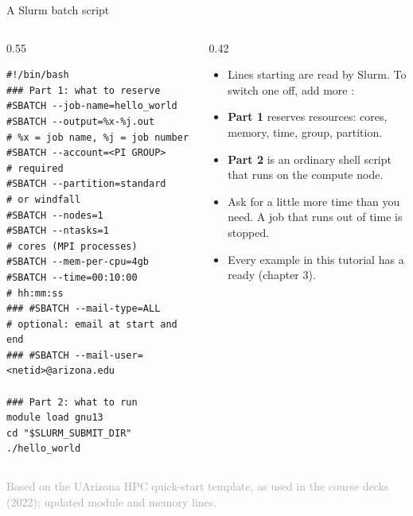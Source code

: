 \documentclass[aspectratio=169,11pt]{beamer}
\newcommand{\sourcecredit}[1]{\vfill\hfill{\tiny\textcolor{DarkGray}{#1}}}
\begin{document}
\begin{frame}[fragile]{A Slurm batch script}
\begin{columns}[T,onlytextwidth]
\begin{column}{0.55\textwidth}
\begin{lstlisting}[style=slurm,basicstyle=\ttfamily\tiny\color{BlackGray}]
#!/bin/bash
### Part 1: what to reserve
#SBATCH --job-name=hello_world
#SBATCH --output=%x-%j.out        # %x = job name, %j = job number
#SBATCH --account=<PI GROUP>      # required
#SBATCH --partition=standard      # or windfall
#SBATCH --nodes=1
#SBATCH --ntasks=1                # cores (MPI processes)
#SBATCH --mem-per-cpu=4gb
#SBATCH --time=00:10:00           # hh:mm:ss
### #SBATCH --mail-type=ALL       # optional: email at start and end
### #SBATCH --mail-user=<netid>@arizona.edu

### Part 2: what to run
module load gnu13
cd "$SLURM_SUBMIT_DIR"
./hello_world
\end{lstlisting}
\end{column}
\begin{column}{0.42\textwidth}
\begin{itemize}\scriptsize
  \item Lines starting  are read by Slurm. To switch one off, add more \code{\#}: 
  \item \textbf{Part 1} reserves resources: cores, memory, time, group, partition.
  \item \textbf{Part 2} is an ordinary shell script that runs on the compute node.
  \item Ask for a little more time than you need. A job that runs out of time is stopped.
  \item Every example in this tutorial has a ready  (chapter 3).
\end{itemize}
\end{column}
\end{columns}
\sourcecredit{Based on the UArizona HPC quick-start template, as used in the course decks (2022); updated module and memory lines.}
\end{frame}
\end{document}
